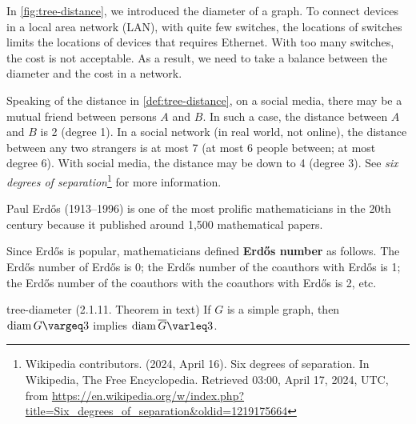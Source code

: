 \documentclass[../src/handouts/main.tex]{subfiles}
\begin{document}
\begin{supplement}
  In \cref{fig:tree-distance}, we introduced the diameter of a graph. To connect devices in a local area network (LAN), with quite few switches, the locations of switches limits the locations of devices that requires Ethernet. With too many switches, the cost is not acceptable. As a result, we need to take a balance between the diameter and the cost in a network.

  Speaking of the distance in \cref{def:tree-distance}, on a social media, there may be a mutual friend between persons $A$ and $B$. In such a case, the distance between $A$ and $B$ is 2 (degree 1). In a social network (in real world, not online), the distance between any two strangers is at most 7 (at most 6 people between; at most degree 6). With social media, the distance may be down to 4 (degree 3). See \textit{six degrees of separation}\footnote{Wikipedia contributors. (2024, April 16). Six degrees of separation. In Wikipedia, The Free Encyclopedia. Retrieved 03:00, April 17, 2024, UTC, from \url{https://en.wikipedia.org/w/index.php?title=Six_degrees_of_separation&oldid=1219175664}} for more information.

  Paul Erdős (1913--1996) is one of the most prolific mathematicians in the 20th century because it published around 1,500 mathematical papers.

  Since Erdős is popular, mathematicians defined \textbf{Erdős number} as follows. The Erdős number of Erdős is 0; the Erdős number of the coauthors with Erdős is 1; the Erdős number of the coauthors with the coauthors with Erdős is 2, etc.
\end{supplement}

\begin{theorem}{}{tree-diameter}
  (2.1.11. Theorem in text)
  If $G$ is a simple graph, then $\diam G \geq 3$ implies $\diam \bar{G} \leq 3$.
\end{theorem}
\end{document}
